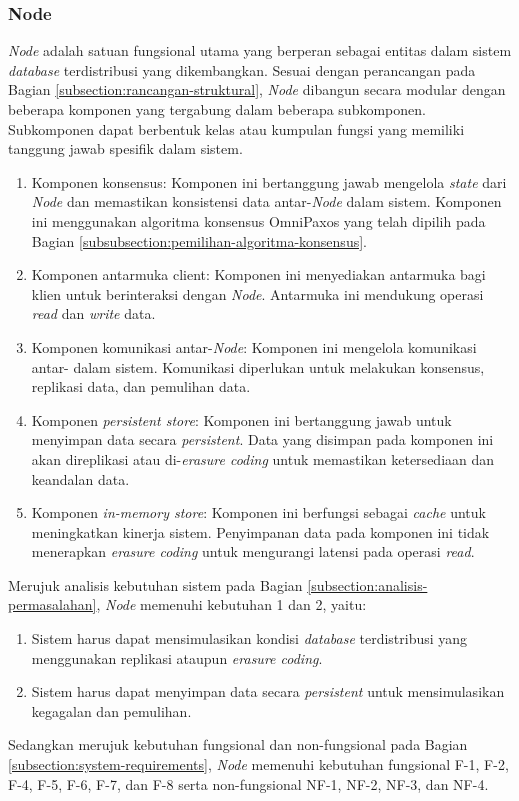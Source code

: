 \subsubsection{Node}
\label{subsubsection:node}

\textit{Node} adalah satuan fungsional utama yang berperan sebagai entitas dalam sistem \textit{database} terdistribusi yang dikembangkan. Sesuai dengan perancangan pada Bagian \ref{subsection:rancangan-struktural}, \textit{Node} dibangun secara modular dengan beberapa komponen yang tergabung dalam beberapa subkomponen. Subkomponen dapat berbentuk kelas atau kumpulan fungsi yang memiliki tanggung jawab spesifik dalam sistem.

\begin{enumerate}
    \item Komponen konsensus: Komponen ini bertanggung jawab mengelola \textit{state} dari \textit{Node} dan memastikan konsistensi data antar-\textit{Node} dalam sistem. Komponen ini menggunakan algoritma konsensus OmniPaxos yang telah dipilih pada Bagian \ref{subsubsection:pemilihan-algoritma-konsensus}.
    \item Komponen antarmuka client: Komponen ini menyediakan antarmuka bagi klien untuk berinteraksi dengan \textit{Node}. Antarmuka ini mendukung operasi \textit{read} dan \textit{write} data.
    \item Komponen komunikasi antar-\textit{Node}: Komponen ini mengelola komunikasi antar- dalam sistem. Komunikasi diperlukan untuk melakukan konsensus, replikasi data, dan pemulihan data.
    \item Komponen \textit{persistent store}: Komponen ini bertanggung jawab untuk menyimpan data secara \textit{persistent}. Data yang disimpan pada komponen ini akan direplikasi atau di-\textit{erasure coding} untuk memastikan ketersediaan dan keandalan data.
    \item Komponen \textit{in-memory store}: Komponen ini berfungsi sebagai \textit{cache} untuk meningkatkan kinerja sistem. Penyimpanan data pada komponen ini tidak menerapkan \textit{erasure coding} untuk mengurangi latensi pada operasi \textit{read}.
\end{enumerate}

Merujuk analisis kebutuhan sistem pada Bagian \ref{subsection:analisis-permasalahan}, \textit{Node} memenuhi kebutuhan 1 dan 2, yaitu:

\begin{enumerate}
    \item Sistem harus dapat mensimulasikan kondisi \textit{database} terdistribusi yang menggunakan replikasi ataupun \textit{erasure coding}.
    \item Sistem harus dapat menyimpan data secara \textit{persistent} untuk mensimulasikan kegagalan dan pemulihan.
\end{enumerate}

Sedangkan merujuk kebutuhan fungsional dan non-fungsional pada Bagian \ref{subsection:system-requirements}, \textit{Node} memenuhi kebutuhan fungsional F-1, F-2, F-4, F-5, F-6, F-7, dan F-8 serta non-fungsional NF-1, NF-2, NF-3, dan NF-4.
